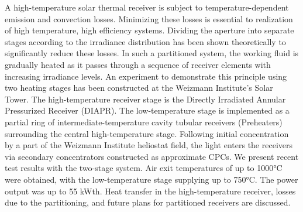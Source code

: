 A high-temperature solar thermal receiver is subject to temperature-dependent emission and convection losses. Minimizing these losses is essential to realization of high temperature, high efficiency systems. Dividing the aperture into separate stages according to the irradiance distribution has been shown theoretically to significantly reduce these losses. In such a partitioned system, the working fluid is gradually heated as it passes through a sequence of receiver elements with increasing irradiance levels. An experiment to demonstrate this principle using two heating stages has been constructed at the Weizmann Institute’s Solar Tower. The high-temperature receiver stage is the Directly Irradiated Annular Pressurized Receiver (DIAPR). The low-temperature stage is implemented as a partial ring of intermediate-temperature cavity tubular receivers (Preheaters) surrounding the central high-temperature stage. Following initial concentration by a part of the Weizmann Institute heliostat field, the light enters the receivers via secondary concentrators constructed as approximate CPCs. We present recent test results with the two-stage system. Air exit temperatures of up to 1000°C were obtained, with the low-temperature stage supplying up to 750°C. The power output was up to 55 kWth. Heat transfer in the high-temperature receiver, losses due to the partitioning, and future plans for partitioned receivers are discussed.

